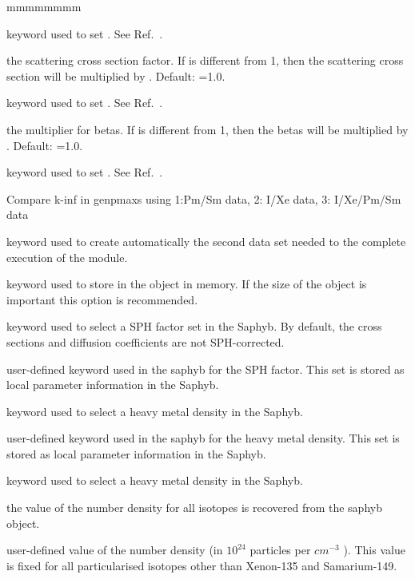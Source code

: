 \begin{ListeDeDescription}{mmmmmmmm}
\item[\moc{SFAC}]  keyword used to set . See Ref.~.
\item[\dusa{sfac}] the scattering cross section factor. If  is different from 1, then the scattering cross section will be multiplied by . Default: =1.0.
\item[\moc{BFAC}]  keyword used to set . See Ref.~.
\item[\dusa{bfac}] the multiplier for betas. If  is different from 1, then the betas will be multiplied by . Default: =1.0.
\item[\moc{XESM}]  keyword used to set . See Ref.~.
\item[\dusa{xesmopt}] Compare k-inf in genpmaxs using 1:Pm/Sm data, 2: I/Xe data, 3: I/Xe/Pm/Sm data
\item[\moc{PROC}] keyword used to create automatically the second data set needed to the complete execution of the module.
\item[\moc{MEMO}] keyword used to store in the  object in memory. If the size of the object is important this option is recommended.
\item[\moc{EQUI}]   keyword used to select a SPH factor set in the Saphyb. By default, the cross sections
and diffusion coefficients are not SPH-corrected.
\item[\dusa{hequi}]  user-defined keyword used in the saphyb for the SPH factor. This set is stored as local parameter information in the Saphyb.
\item[\moc{MASL}]    keyword used to select a heavy metal density in the Saphyb. 
\item[\dusa{hmasl}]  user-defined keyword used in the saphyb for the heavy metal density. This set is stored as local parameter information in the Saphyb.
\item[\moc{ISOT}]    keyword used to select a heavy metal density in the Saphyb. 
\item[\dusa{*}]  the value of the number density for all isotopes is recovered from the saphyb object.
\item[\dusa{isotval}] user-defined value of the number density (in $10^{24}$ particles per $cm^{-3}$ ). This value is fixed for all particularised isotopes other than Xenon-135 and Samarium-149.
\end{ListeDeDescription}

\clearpage
